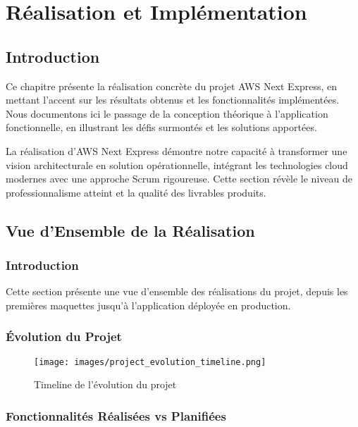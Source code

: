\chapter{Réalisation et Implémentation}

\section{Introduction}

Ce chapitre présente la réalisation concrète du projet AWS Next Express, en mettant l'accent sur les résultats obtenus et les fonctionnalités implémentées. Nous documentons ici le passage de la conception théorique à l'application fonctionnelle, en illustrant les défis surmontés et les solutions apportées.

La réalisation d'AWS Next Express démontre notre capacité à transformer une vision architecturale en solution opérationnelle, intégrant les technologies cloud modernes avec une approche Scrum rigoureuse. Cette section révèle le niveau de professionnalisme atteint et la qualité des livrables produits.

\section{Vue d'Ensemble de la Réalisation}

\subsection{Introduction}

Cette section présente une vue d'ensemble des réalisations du projet, depuis les premières maquettes jusqu'à l'application déployée en production.

\subsection{Évolution du Projet}

\begin{figure}[H]
    \centering
    \texttt{[image: images/project\_evolution\_timeline.png]}
    \caption{Timeline de l'évolution du projet}
    \label{fig:project_evolution}
\end{figure}

\subsection{Fonctionnalités Réalisées vs Planifiées}

